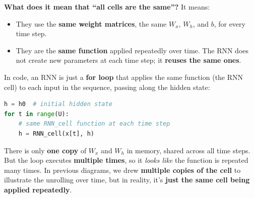 \highspace
\textcolor{Green3}{ \textbf{What does it mean that ``all cells are the same''?}} It means:
\begin{itemize}
    \item They use the \textbf{same weight matrices}, the same $W_x$, $W_h$, and $b$, for every time step.
    \item They are the \textbf{same function} applied repeatedly over time. The RNN does not create new parameters at each time step; it \textbf{reuses the same ones}.
\end{itemize}
In code, an RNN is just a \textbf{for loop} that applies the same function (the RNN cell) to each input in the sequence, passing along the hidden state:
\begin{lstlisting}[language=Python]
h = h0  # initial hidden state
for t in range(U):
    # same RNN_cell function at each time step
    h = RNN_cell(x[t], h)\end{lstlisting}
There is only \textbf{one copy} of $W_x$ and $W_h$ in memory, shared across all time steps. But the loop executes \textbf{multiple times}, so it \emph{looks like} the function is repeated many times. In previous diagrams, we drew \textbf{multiple copies of the cell} to illustrate the unrolling over time, but in reality, it's \textbf{just the same cell being applied repeatedly}.

